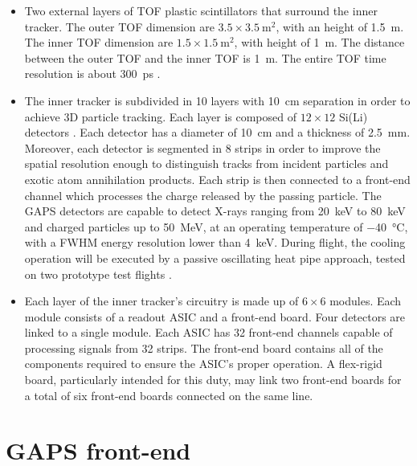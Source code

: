 \begin{itemize}
    \itemsep0em
    \item Two external layers of TOF plastic scintillators that surround the inner tracker. The outer TOF dimension are $3.5 \times \SI{3.5}{\metre\squared}$, with an height of \SI{1.5}{\metre}. The inner TOF dimension are $1.5 \times \SI{1.5}{\metre\squared}$, with height of \SI{1}{\metre}. The distance between the outer TOF and the inner TOF is \SI{1}{\metre}. The entire TOF time resolution is about \SI{300}{\pico\second} \cite{doetinchem_2020_cosmicray}.
    \item The inner tracker is subdivided in 10 layers with \SI{10}{\cm} separation in order to achieve 3D particle tracking. Each layer is composed of $12 \times 12$ Si(Li) detectors \cite{spieler_2014_semiconductor}. Each detector has a diameter of \SI{10}{\cm} and a thickness of \SI{2.5}{\mm}. Moreover, each detector is segmented in 8 strips in order to improve the spatial resolution enough to distinguish tracks from incident particles and exotic atom annihilation products. Each strip is then connected to a front-end channel which processes the charge released by the passing particle. The GAPS detectors are capable to detect X-rays ranging from \SI{20}{\kilo\electronvolt} to \SI{80}{\kilo\electronvolt} and charged particles up to \SI{50}{\mega\electronvolt}, at an operating temperature of \SI{-40}{\celsius}, with a FWHM energy resolution lower than \SI{4}{\kilo\electronvolt}. During flight, the cooling operation will be executed by a passive oscillating heat pipe approach, tested on two prototype test flights \cite{okazaki_2014_development}.
    \item Each layer of the inner tracker's circuitry is made up of $6 \times 6$ modules. Each module consists of a readout ASIC and a front-end board. Four detectors are linked to a single module. Each ASIC has 32 front-end channels capable of processing signals from 32 strips. The front-end board contains all of the components required to ensure the ASIC's proper operation. A flex-rigid board, particularly intended for this duty, may link two front-end boards for a total of six front-end boards connected on the same line.
\end{itemize}


\section{GAPS front-end}
\label{secGAPSfrontend}

